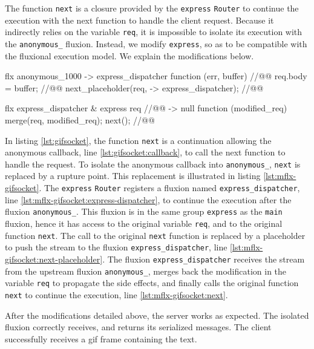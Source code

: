 The function \texttt{next} is a closure provided by the \texttt{express} \texttt{Router} to continue the execution with the next function to handle the client request.
Because it indirectly relies on the variable \texttt{req}, it is impossible to isolate its execution with the \texttt{anonymous\_} fluxion.
Instead, we modify \texttt{express}, so as to be compatible with the fluxional execution model.
We explain the modifications below.

\begin{code}[flx, caption={Simplified modification on the compiled result},label={lst:mflx-gifsocket}]
flx anonymous_1000
-> express_dispatcher
  function (err, buffer) { //@\label{lst:mflx-gifsocket:callback}@
    req.body = buffer; //@\label{lst:mflx-gifsocket:buffer}@
    next_placeholder(req, -> express_dispatcher); //@\label{lst:mflx-gifsocket:next-placeholder}@
  }

flx express_dispatcher & express {req} //@\label{lst:mflx-gifsocket:express-dispatcher}@
-> null
  function (modified_req) {
    merge(req, modified_req);
    next(); //@\label{lst:mflx-gifsocket:next}@
  }
\end{code}

In listing \ref{lst:gifsocket}, the function \texttt{next} is a continuation allowing the anonymous callback, line \ref{lst:gifsocket:callback}, to call the next function to handle the request.
To isolate the anonymous callback into \texttt{anonymous\_}, \texttt{next} is replaced by a rupture point.
This replacement is illustrated in listing \ref{lst:mflx-gifsocket}.
The \texttt{express} \texttt{Router} registers a fluxion named \texttt{express\_\-dispatcher}, line \ref{lst:mflx-gifsocket:express-dispatcher}, to continue the execution after the fluxion \texttt{anonymous\_}.
This fluxion is in the same group \texttt{express} as the \texttt{main} fluxion, hence it has access to the original variable \texttt{req}, and to the original function \texttt{next}.
The call to the original \texttt{next} function is replaced by a placeholder to push the stream to the fluxion \texttt{express\_\-dispatcher}, line \ref{lst:mflx-gifsocket:next-placeholder}.
The fluxion \texttt{express\_\-dispatcher} receives the stream from the upstream fluxion \texttt{anonymous\_}, merges back the modification in the variable \texttt{req} to propagate the side effects, and finally calls the original function \texttt{next} to continue the execution, line \ref{lst:mflx-gifsocket:next}.

After the modifications detailed above, the server works as expected.
The isolated fluxion correctly receives, and returns its serialized messages.
The client successfully receives a gif frame containing the text.




